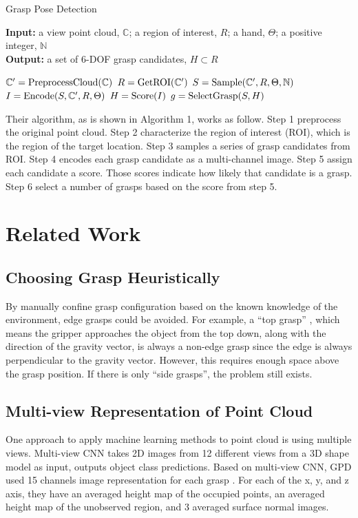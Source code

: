 \documentclass[letterpaper]{article} %
\begin{document}
\begin{algorithm}[H]
\caption{Grasp Pose Detection}
\textbf{Input:} a view point cloud,  $\mathbb{C}$; a region of interest, $R$; a hand, $\Theta$; a positive integer, $\mathbb{N}$ \\
\textbf{Output:} a set of 6-DOF grasp candidates, $H\subset R$ \\
\begin{algorithmic}[1]
\STATE $\mathbb{C}'={\rm PreprocessCloud}(\mathbb{C})$
\STATE $R={\rm GetROI}(\mathbb{C}')$
\STATE $S={\rm Sample}(\mathbb{C}',R,\Theta, \mathbb{N})$
\STATE $I={\rm Encode}(S,\mathbb{C}', R, \Theta)$
\STATE $H={\rm Score}(I)$
\STATE $g={\rm SelectGrasp}(S, H)$
\end{algorithmic}  
\end{algorithm}  

Their algorithm, as is shown in Algorithm 1, works as follow. Step 1 preprocess the original point cloud. Step 2 characterize the region of interest (ROI), which is the region of the target location. Step 3 samples a series of grasp candidates from ROI. Step 4 encodes each grasp candidate as a multi-channel image. Step 5 assign each candidate a score. Those scores indicate how likely that candidate is a grasp. Step 6 select a number of grasps based on the score from step 5.


\section{Related Work}
\subsection{Choosing Grasp Heuristically}
By manually confine grasp configuration based on the known knowledge of the environment, edge grasps could be avoided. For example, a “top grasp” \cite{RN8}, which means the gripper approaches the object from the top down, along with the direction of the gravity vector, is always a non-edge grasp since the edge is always perpendicular to the gravity vector. However, this requires enough space above the grasp position. If there is only “side grasps”, the problem still exists.

\subsection{Multi-view Representation of Point Cloud}
One approach to apply machine learning methods to point cloud is using multiple views. Multi-view CNN \cite{RN7} takes 2D images from 12 different views from a 3D shape model as input, outputs object class predictions.
Based on multi-view CNN, GPD used 15 channels image representation for each grasp \cite{RN6}. For each of the x, y, and z axis, they have an averaged height map of the occupied points, an averaged height map of the unobserved region, and 3 averaged surface normal images.
\end{document}
